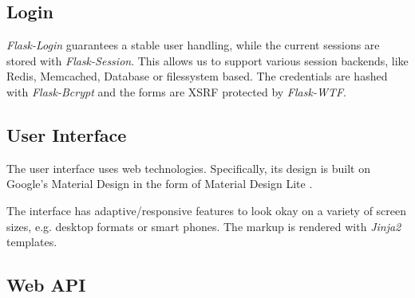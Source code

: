 \subsection{Login}
\label{gXLII:sec:implementation:login}  %
\textit{Flask-Login} guarantees a stable user handling, while the current sessions are stored with \textit{Flask-Session}. This allows us to support various session backends, like Redis, Memcached, Database or filessystem based. The credentials are hashed with \textit{Flask-Bcrypt} and the forms are XSRF protected by \textit{Flask-WTF}. 

\subsection{User Interface}
\label{gXLII:sec:implementation:UI}  %

The user interface uses web technologies. Specifically, its design is built on Google's Material Design in the form of Material Design Lite .

The interface has adaptive/responsive features to look okay on a variety of screen sizes, e.g. desktop formats or smart phones.
The markup is rendered with \textit{Jinja2} templates.

\subsection{Web API}
\label{gXLII:sec:implementation:API}  %





